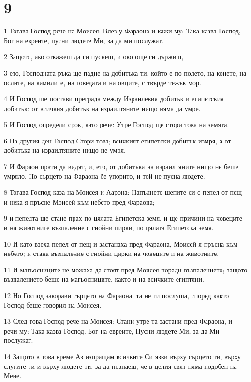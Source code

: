 \chapter{9}

\par 1 Тогава Господ рече на Моисея: Влез у Фараона и кажи му: Така казва Господ, Бог на евреите, пусни людете Ми, за да ми послужат.
\par 2 Защото, ако откажеш да ги пуснеш, и око още ги държиш,
\par 3 ето, Господната ръка ще падне на добитъка ти, който е по полето, на конете, на ослите, на камилите, на говедата и на овците, с твърде тежък мор.
\par 4 И Господ ще постави преграда между Израилевия добитък и египетския добитък; от всичкия добитък на израилтяните нищо няма да умре.
\par 5 И Господ определи срок, като рече: Утре Господ ще стори това на земята.
\par 6 На другия ден Господ Стори това; всичкият египетски добитък измря, а от добитъка на израилтяните нищо не умря.
\par 7 И Фараон прати да видят, и, ето, от добитъка на израилтяните нищо не беше умряло. Но сърцето на Фараона бе упорито, и той не пусна людете.
\par 8 Тогава Господ каза на Моисея и Аарона: Напълнете шепите си с пепел от пещ и нека я пръсне Моисей към небето пред Фараона;
\par 9 и пепелта ще стане прах по цялата Египетска земя, и ще причини на човеците и на животните възпаление с гнойни цирки, по цялата Египетска земя.
\par 10 И като взеха пепел от пещ и застанаха пред Фараона, Моисей я пръсна към небето; и стана възпаление с гнойни цирки на човеците и на животните.
\par 11 И магьосниците не можаха да стоят пред Моисея поради възпалението; защото възпалението беше на магьосниците, както и на всичките египтяни.
\par 12 Но Господ закорави сърцето на Фараона, та не ги послуша, според както Господ беше говорил на Моисея.
\par 13 След това Господ рече на Моисея: Стани утре та застани пред Фараона, и речи му: Така казва Господ, Бог на евреите, Пусни людете Ми, за да Ми послужат.
\par 14 Защото в това време Аз изпращам всичките Си язви върху сърцето ти, върху слугите ти и върху людете ти, за да познаеш, че в целия свят няма подобен на Мене.
